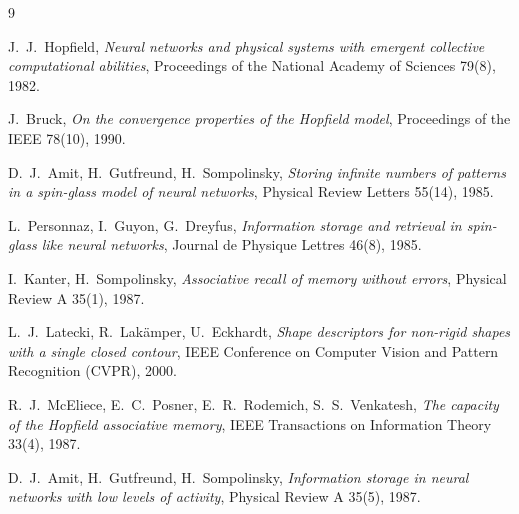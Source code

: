 \documentclass{article}
\begin{document}
\begin{thebibliography}{9}

J.~J.~Hopfield, \emph{Neural networks and physical systems with emergent collective computational abilities},
Proceedings of the National Academy of Sciences 79(8), 1982.

J.~Bruck, \emph{On the convergence properties of the Hopfield model},
Proceedings of the IEEE 78(10), 1990.

D.~J.~Amit, H.~Gutfreund, H.~Sompolinsky, \emph{Storing infinite numbers of patterns in a spin-glass model of neural networks},
Physical Review Letters 55(14), 1985.

L.~Personnaz, I.~Guyon, G.~Dreyfus, \emph{Information storage and retrieval in spin-glass like neural networks},
Journal de Physique Lettres 46(8), 1985.

I.~Kanter, H.~Sompolinsky, \emph{Associative recall of memory without errors},
Physical Review A 35(1), 1987.

L.~J.~Latecki, R.~Lakämper, U.~Eckhardt, \emph{Shape descriptors for non-rigid shapes with a single closed contour},
IEEE Conference on Computer Vision and Pattern Recognition (CVPR), 2000.

R.~J.~McEliece, E.~C.~Posner, E.~R.~Rodemich, S.~S.~Venkatesh, \emph{The capacity of the Hopfield associative memory},
IEEE Transactions on Information Theory 33(4), 1987.

D.~J.~Amit, H.~Gutfreund, H.~Sompolinsky, \emph{Information storage in neural networks with low levels of activity},
Physical Review A 35(5), 1987.

\end{thebibliography}
\end{document}
